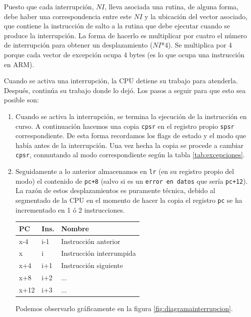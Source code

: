 Puesto que cada interrupción, $NI$, lleva asociada una rutina, de
alguna forma, debe haber una correspondencia entre este $NI$
y la ubicación del vector asociado, que contiene la instrucción de salto a la rutina que debe
ejecutar cuando se produce la interrupción. La forma de hacerlo es multiplicar por
cuatro el número de interrupción para obtener un desplazamiento
($NI$*4). Se multiplica por 4 porque cada vector de excepción
ocupa 4 bytes (es lo que ocupa una instrucción en ARM).

Cuando se activa una interrupción, la CPU detiene su trabajo para
atenderla. Después, continúa su trabajo donde lo dejó. Los pasos a
seguir para que esto sea posible son:

\begin{enumerate}
  \item Cuando se activa la interrupción, se termina la ejecución de la
    instrucción en curso. A continuación hacemos una copia {\tt cpsr} en el registro
    propio {\tt spsr} correspondiente. De esta forma recordamos los flags de estado
    y el modo que había antes de la interrupción. Una vez hecha la copia se
    procede a cambiar {\tt cpsr}, conmutando al modo correspondiente
    según la tabla \ref{tab:excepciones}.

  \item Seguidamente a lo anterior almacenamos en {\tt lr} (en su registro propio del modo)
    el contenido de {\tt pc+8} (salvo si es un {\tt error en datos} que sería
    {\tt pc+12}). La razón de estos
    desplazamientos es puramente técnica, debido al segmentado de la CPU en
    el momento de hacer la copia el registro {\tt pc} se ha incrementado en 1 ó
    2 instrucciones.

\begin{longtable}{ p{1.8cm} | p{2cm} | p{5cm} }
\hline
{\bf PC} & {\bf Ins.} & {\bf Nombre} \\ \hline
x-4  & i-1 & Instrucción anterior \\ \hline
x & i & Instrucción interrumpida \\ \hline
x+4 & i+1 & Instrucción siguiente \\ \hline
x+8 & i+2 & ...     \\ \hline
x+12 & i+3 & ... \\ \hline
\end{longtable}

    Podemos observarlo gráficamente en la figura \ref{fig:diagramainterrupcion}.


\end{enumerate}
